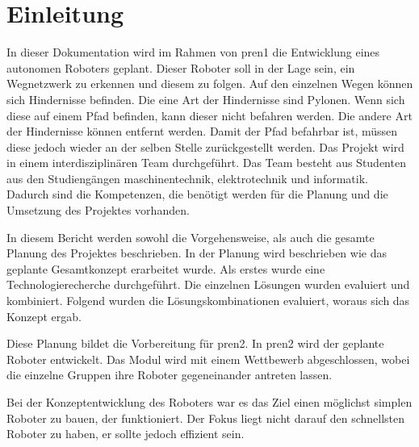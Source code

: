 \section{Einleitung}

In dieser Dokumentation wird im Rahmen von \acrfull{pren1} die Entwicklung eines autonomen Roboters geplant. Dieser Roboter soll in der Lage sein, ein Wegnetzwerk zu erkennen und diesem zu folgen. Auf den einzelnen Wegen können sich Hindernisse befinden. Die eine Art der Hindernisse sind Pylonen. Wenn sich diese auf einem Pfad befinden, kann dieser nicht befahren werden. Die andere Art der Hindernisse können entfernt werden. Damit der Pfad befahrbar ist, müssen diese jedoch wieder an der selben Stelle zurückgestellt werden.
Das Projekt wird in einem interdisziplinären Team durchgeführt. Das Team besteht aus Studenten aus den Studiengängen \acrfull{maschinentechnik}, \acrfull{elektrotechnik} und \acrfull{informatik}. Dadurch sind die Kompetenzen, die benötigt werden für die Planung und die Umsetzung des Projektes vorhanden.

In diesem Bericht werden sowohl die Vorgehensweise, als auch die gesamte Planung des Projektes beschrieben. In der Planung wird beschrieben wie das geplante Gesamtkonzept erarbeitet wurde. Als erstes wurde eine Technologierecherche durchgeführt. Die einzelnen Lösungen wurden evaluiert und kombiniert. Folgend wurden die Lösungskombinationen evaluiert, woraus sich das Konzept ergab.

Diese Planung bildet die Vorbereitung für \acrfull{pren2}. In \acrshort{pren2} wird der geplante Roboter entwickelt. Das Modul wird mit einem Wettbewerb abgeschlossen, wobei die einzelne Gruppen ihre Roboter gegeneinander antreten lassen.

Bei der Konzeptentwicklung des Roboters war es das Ziel einen möglichst simplen Roboter zu bauen, der funktioniert. Der Fokus liegt nicht darauf den schnellsten Roboter zu haben, er sollte jedoch effizient sein.
